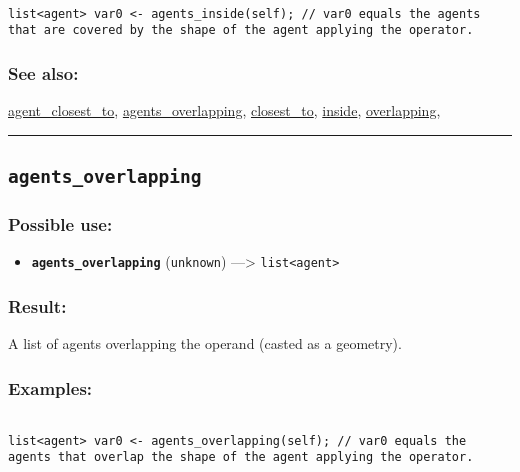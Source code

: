\documentclass[]{book}
\providecommand{\tightlist}{%
  \setlength{\itemsep}{0pt}\setlength{\parskip}{0pt}}
\theoremstyle{definition}
\theoremstyle{definition}
\theoremstyle{definition}
\theoremstyle{remark}
\begin{document}
\begin{verbatim}
 
list<agent> var0 <- agents_inside(self); // var0 equals the agents that are covered by the shape of the agent applying the operator.
\end{verbatim}

\subsubsection{See also:}\label{see-also-22}

\href{operators-a-to-a.html\#agent_closest_to}{agent\_closest\_to},
\href{operators-a-to-a.html\#agents_overlapping}{agents\_overlapping},
\href{operators-b-to-c.html\#closest_to}{closest\_to},
\href{operators-i-to-m.html\#inside}{inside},
\href{operators-n-to-r.html\#overlapping}{overlapping},

\begin{center}\rule{0.5\linewidth}{\linethickness}\end{center}

\subsection{\texorpdfstring{\texttt{agents\_overlapping}}{agents\_overlapping}}\label{agents_overlapping}

\subsubsection{Possible use:}\label{possible-use-31}

\begin{itemize}
\tightlist
\item
  \textbf{\texttt{agents\_overlapping}} (\texttt{unknown})
  ---\textgreater{} \texttt{list\textless{}agent\textgreater{}}
\end{itemize}

\subsubsection{Result:}\label{result-30}

A list of agents overlapping the operand (casted as a geometry).

\subsubsection{Examples:}\label{examples-24}

\begin{verbatim}
 
list<agent> var0 <- agents_overlapping(self); // var0 equals the agents that overlap the shape of the agent applying the operator.
\end{verbatim}
\end{document}
